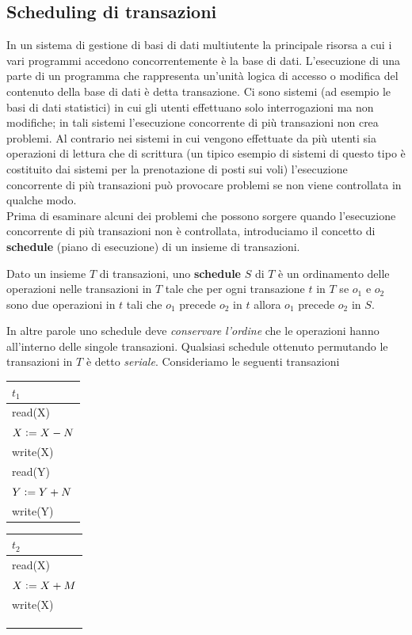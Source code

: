 \subsection{Scheduling di transazioni}
In un sistema di gestione di basi di dati multiutente la principale risorsa a cui i vari programmi
accedono concorrentemente è la base di dati. L'esecuzione di una parte di un programma che
rappresenta un'unità logica di accesso o modifica del contenuto della base di dati è detta
transazione. Ci sono sistemi (ad esempio le basi di dati statistici) in cui gli utenti effettuano solo
interrogazioni ma non modifiche; in tali sistemi l'esecuzione concorrente di più transazioni non crea
problemi. Al contrario nei sistemi in cui vengono effettuate da più utenti sia operazioni di lettura
che di scrittura (un tipico esempio di sistemi di questo tipo è costituito dai sistemi per la
prenotazione di posti sui voli) l'esecuzione concorrente di più transazioni può provocare problemi
se non viene controllata in qualche modo.\\
Prima di esaminare alcuni dei problemi che possono sorgere quando l'esecuzione concorrente di più
transazioni non è controllata, introduciamo il concetto di \textbf{schedule} (piano di esecuzione) di un
insieme di transazioni.
\begin{defn}
Dato un insieme $T$ di transazioni, uno \textbf{schedule} $S$ di $T$ è un ordinamento delle
operazioni nelle transazioni in $T$ tale che per ogni transazione $t$ in $T$ se $o_1$ e $o_2$ sono due operazioni
in $t$ tali che $o_1$ precede $o_2$ in $t$ allora $o_1$ precede $o_2$ in $S$.
\end{defn}
In altre parole uno schedule deve \emph{conservare l'ordine} che le operazioni hanno all'interno delle singole 
transazioni. Qualsiasi schedule ottenuto permutando le transazioni in $T$ è detto \emph{seriale}.
Consideriamo le seguenti transazioni

\begin{multicols}{2}  
 \begin{tabular}{|l|}
   \hline
   $t_1$\\
   \hline
   read(X)\\ 
   $X\vcentcolon=X-N$\\ 
   write(X)\\ 
   read(Y)\\
   $Y\vcentcolon=Y+N$\\
   write(Y)\\
   \hline
  \end{tabular} 
  
 \begin{tabular}{|l|}
  \hline
   $t_2$\\
   \hline
   read(X)\\ 
   $X\vcentcolon=X+M$\\ 
   write(X)\\
   \\
   \\
   \hline\\
  \end{tabular}
 \end{multicols}
 
